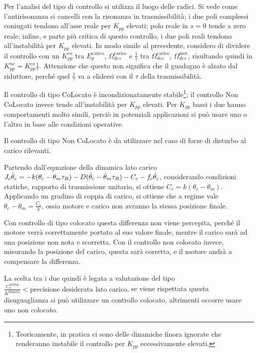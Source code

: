 Per l'analisi del tipo di controllo si utilizza il luogo delle radici. Si vede come l'antirisonanza si cancelli con la risonanza in trasmissibilità; i due poli complessi coniugati tendono all'asse reale per \(K_{pp}\) elevati; polo reale in \(s=0\) tende a zero reale; infine, e parte più critica di questo controllo, i due poli reali tendono all'instabilità per \(K_{pp}\) elevati.
In modo simile al precedente, considero di dividere il controllo con un \(K_{pp}^{co}\) tra \(E_p^\text{carico}\), \(\Omega_{des}^\text{carico}\) e \(\frac{1}{\tau}\) tra \(\Omega_{des}^\text{carico}\), \(\Omega_{des}^\text{mot}\), risultando quindi in \(K_{pp}^{nc} = K_{pp}^{co} \frac{1}{\tau}\).
Attenzione che questo non significa che il guadagno è alzato dal riduttore, perché quel \(\frac{1}{\tau}\) va a elidersi con il \(\tau\) della trasmissibilità.

Il controllo di tipo CoLocato è incondizionatamente stabile\footnote{Teoricamente, in pratica ci sono delle dinamiche finora ignorate che renderanno instabile il controllo per \(K_{pp}\) eccessivamente elevati.}; il controllo Non CoLocato invece tende all'instabilità per \(K_{pp}\) elevati.
Per \(K_{pp}\) bassi i due hanno comportamenti molto simili, perciò in potenziali applicazioni si può usare uno o l'altro in base alle condizioni operative.

Il controllo di tipo Non CoLocato è da utilizzare nel caso di forze di disturbo al carico rilevanti. 

Partendo dall'equazione della dinamica lato carico \(J_c \Ddot{\theta}_c = -k(\theta_c - \theta_m \tau_R) - D(\dot{\theta}_c - \dot{\theta}_m\tau_R) - C_c - f_c\dot{\theta}_c\), considerando condizioni statiche, rapporto di trasmissione unitario, si ottiene \(C_c = k(\theta_c - \theta_m)\).
Applicando un gradino di coppia di carico, si ottiene che a regime vale \(\theta_c - \theta_m = \frac{C_c}{k}\), ossia motore e carico non avranno la stessa posizione finale.

Con controllo di tipo colocato questa differenza non viene percepita, perché il motore verrà correttamente portato al suo valore finale, mentre il carico sarà ad una posizione non nota e scorretta.
Con il controllo non colocato invece, misurando la posizione del carico, questa sarà corretta, e il motore andrà a compensare la differenza.

La scelta tra i due quindi è legata a valutazione del tipo \(\frac{C_c^\text{attesa}}{K^\text{stimata}} < \text{precisione desiderata lato carico}\), se viene rispettata questa disuguaglianza si può utilizzare un controllo colocato, altrimenti occorre usare uno non colocato.


